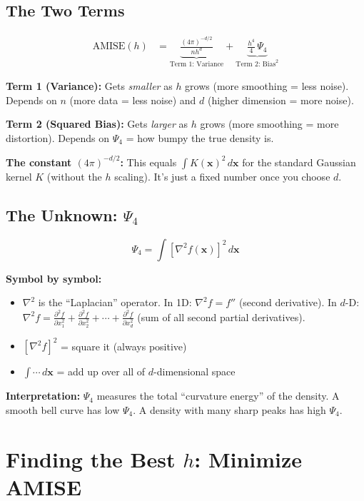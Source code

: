 \documentclass[12pt]{article}
\newcommand{\note}[1]{\begin{tcolorbox}[colback=yellow!5,colframe=yellow!60!black,breakable]\small #1\end{tcolorbox}}
\begin{document}
\subsection{The Two Terms}

\begin{align*}
\text{AMISE}(h) &= \underbrace{\frac{(4\pi)^{-d/2}}{n h^d}}_{\text{Term 1: Variance}} + \underbrace{\frac{h^4}{4}\,\Psi_4}_{\text{Term 2: Bias}^2}
\end{align*}

\note{
\textbf{Term 1 (Variance):} Gets \textit{smaller} as $h$ grows (more smoothing = less noise). Depends on $n$ (more data = less noise) and $d$ (higher dimension = more noise).

\textbf{Term 2 (Squared Bias):} Gets \textit{larger} as $h$ grows (more smoothing = more distortion). Depends on $\Psi_4$ = how bumpy the true density is.

\textbf{The constant $(4\pi)^{-d/2}$:} This equals $\int K(\mathbf{x})^2\,d\mathbf{x}$ for the standard Gaussian kernel $K$ (without the $h$ scaling). It's just a fixed number once you choose $d$.
}

\subsection{The Unknown: $\Psi_4$}

$$\Psi_4 = \int [\nabla^2 f(\mathbf{x})]^2\,d\mathbf{x}$$

\note{
\textbf{Symbol by symbol:}
\begin{itemize}
\item $\nabla^2$ is the ``Laplacian'' operator. In 1D: $\nabla^2 f = f''$ (second derivative). In $d$-D: $\nabla^2 f = \frac{\partial^2 f}{\partial x_1^2} + \frac{\partial^2 f}{\partial x_2^2} + \cdots + \frac{\partial^2 f}{\partial x_d^2}$ (sum of all second partial derivatives).
\item $[\nabla^2 f]^2$ = square it (always positive)
\item $\int \cdots\, d\mathbf{x}$ = add up over all of $d$-dimensional space
\end{itemize}
\textbf{Interpretation:} $\Psi_4$ measures the total ``curvature energy'' of the density. A smooth bell curve has low $\Psi_4$. A density with many sharp peaks has high $\Psi_4$.}

\section{Finding the Best $h$: Minimize AMISE}
\end{document}
